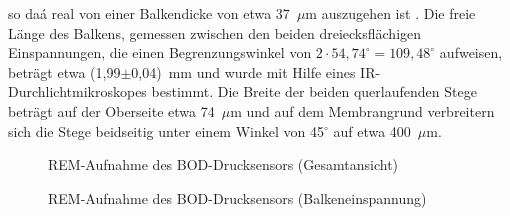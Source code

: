 so daá real von einer Balkendicke von etwa 37~$\mu$m auszugehen ist
\cite{Sch94}. Die freie Länge des Balkens, gemessen
zwischen den beiden dreiecksflächigen Einspannungen, die einen
Begrenzungswinkel von $2 \cdot 54,74^{\circ} = 109,48^{\circ}$ aufweisen,
beträgt etwa (1,99$\pm$0,04)~mm und wurde mit Hilfe eines
IR-Durchlichtmikroskopes bestimmt.
Die Breite der beiden querlaufenden Stege beträgt auf der Oberseite etwa
74~$\mu$m und auf dem Membrangrund verbreitern sich die Stege beidseitig
unter einem Winkel von 45$^{\circ}$ auf etwa 400~$\mu$m.\\
\begin{figure}[ht]
\begin{minipage}[t]{7cm}
\vspace*{0.25cm}

\begin{center}

\setabsezeb
\end{center}
\caption{\label{abbbodrem1}
 REM-Aufnahme des BOD-Drucksensors (Gesamtansicht)}
\end{minipage}
\hfill
\begin{minipage}[t]{7cm}
\vspace*{0.25cm}

\begin{center}

\setabsezea
\end{center}
\caption{\label{abbbodrem2}
 REM-Aufnahme des BOD-Drucksensors (Balkeneinspannung)}
\end{minipage}
\end{figure}

